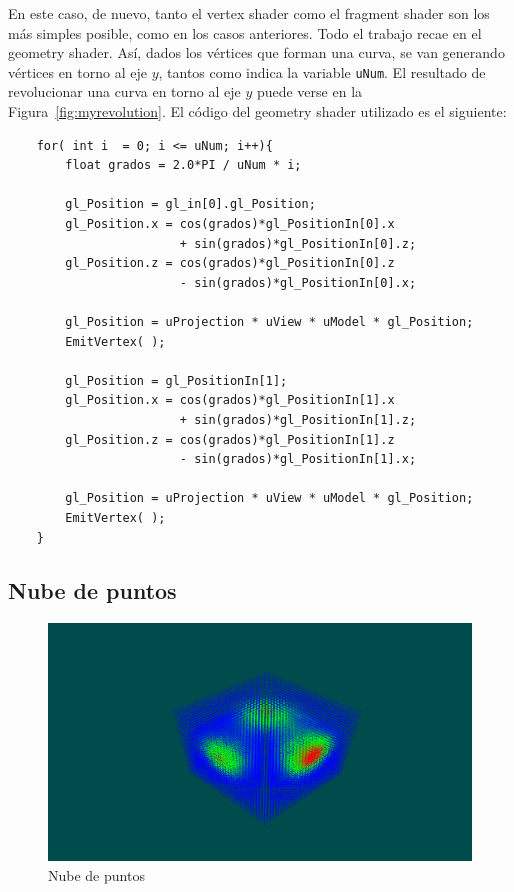 En este caso, de nuevo, tanto el vertex shader como el fragment shader son los
más simples posible, como en los casos anteriores. Todo el trabajo recae en el
geometry shader. Así, dados los vértices que forman una curva, se van generando
vértices en torno al eje $y$, tantos como indica la variable \verb|uNum|. El
resultado de revolucionar una curva en torno al eje $y$ puede verse en la
Figura~\ref{fig:myrevolution}. El código del geometry shader utilizado es el
siguiente:

\begin{verbatim}
    for( int i  = 0; i <= uNum; i++){
        float grados = 2.0*PI / uNum * i;
        
        gl_Position = gl_in[0].gl_Position;
        gl_Position.x = cos(grados)*gl_PositionIn[0].x 
		                + sin(grados)*gl_PositionIn[0].z;
        gl_Position.z = cos(grados)*gl_PositionIn[0].z 
		                - sin(grados)*gl_PositionIn[0].x;

        gl_Position = uProjection * uView * uModel * gl_Position;
        EmitVertex( );
        
        gl_Position = gl_PositionIn[1];
        gl_Position.x = cos(grados)*gl_PositionIn[1].x 
		                + sin(grados)*gl_PositionIn[1].z;
        gl_Position.z = cos(grados)*gl_PositionIn[1].z 
		                - sin(grados)*gl_PositionIn[1].x;

        gl_Position = uProjection * uView * uModel * gl_Position;
        EmitVertex( );
    }
\end{verbatim}

\subsection{Nube de puntos}
\label{makereference5.5.5}

\begin{figure}[h]
	\centering	
	\includegraphics[width=\textwidth]{figures/mycloud.png}
	\caption{Nube de puntos}
	\label{fig:mycloud}
\end{figure}

